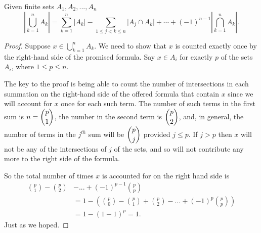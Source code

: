 \begin{thm}
 Given finite sets $A_1,A_2,...,A_n$
 \[
 \left\lvert\bigcup_{k=1}^n {A_k}\right\rvert %
   =\sum_{k=1}^n \lvert A_k\rvert - \sum_{1\leq j<k\leq n} \lvert A_j\cap A_k\rvert
 +\cdots + (-1)^{n-1}\left\lvert\bigcap_{k=1}^n A_k\right\rvert.
 \]
\end{thm}
\begin{proof}
 Suppose $x\in\bigcup_{k=1}^n {A_k}$.  We need to show that $x$ is counted
 exactly once by the right-hand side of the promised formula.
 Say $x\in A_i$ for exactly $p$ of the sets $A_i$, where $1\leq p\leq n$.
 
 The key to the proof is being able to count  the number of intersections in each summation 
 on the right-hand
 side of the offered formula that contain $x$ since we will account for $x$ once for each such term.
 The number of such terms in the first sum is $\displaystyle n = {p\choose 1}$,
 the number in the second term is $\displaystyle {p\choose 2}$, and, in general, the number of terms
 in the $j^{th}$ sum will be $\displaystyle {p\choose j}$ provided $j\leq p$. If $j>p$ then $x$ will not
 be any of the intersections of $j$ of the sets, and so will not contribute any more to the
 right side of the formula. 
 
 So the total number of times $x$ is accounted for on the right hand side is
 \begin{align*}
  {p\choose 1}-{p\choose 2}&-...+(-1)^{p-1}{p\choose p} \\
  &= 1- \left( {p\choose 0} -{p\choose 1}+{p\choose 2}-...+(-1)^p{p\choose p}\right) \\
  &= 1 - (1-1)^p = 1.
 \end{align*}
Just as we hoped.
\end{proof}

